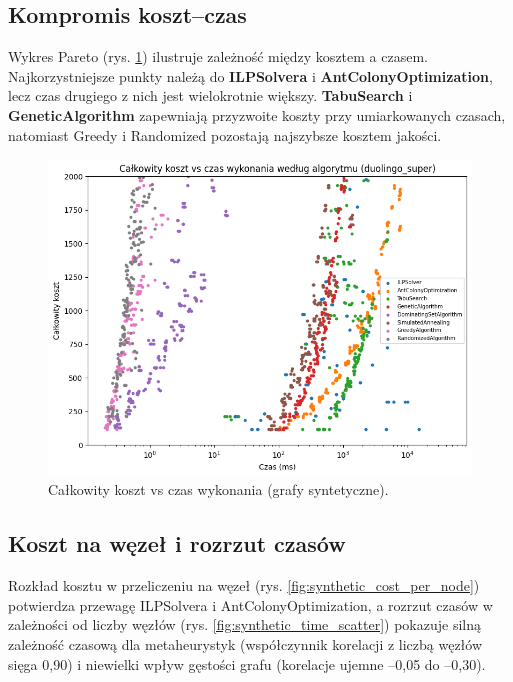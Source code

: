 \subsection{Kompromis koszt--czas}

Wykres Pareto (rys. \ref{fig:synthetic_pareto}) ilustruje zależność między kosztem a czasem. Najkorzystniejsze punkty należą do \textbf{ILPSolvera} i \textbf{AntColonyOptimization}, lecz czas drugiego z nich jest wielokrotnie większy. \textbf{TabuSearch} i \textbf{GeneticAlgorithm} zapewniają przyzwoite koszty przy umiarkowanych czasach, natomiast Greedy i Randomized pozostają najszybsze kosztem jakości.

\begin{figure}[H]
  \centering
  \includegraphics[width=0.7\linewidth]{assets/figures/synthetic_pareto.png}
  \caption{Całkowity koszt vs czas wykonania (grafy syntetyczne).}
  \label{fig:synthetic_pareto}
\end{figure}

\subsection{Koszt na węzeł i rozrzut czasów}

Rozkład kosztu w przeliczeniu na węzeł (rys. \ref{fig:synthetic_cost_per_node}) potwierdza przewagę ILPSolvera i AntColonyOptimization, a rozrzut czasów w zależności od liczby węzłów (rys. \ref{fig:synthetic_time_scatter}) pokazuje silną zależność czasową dla metaheurystyk (współczynnik korelacji z liczbą węzłów sięga 0,90) i niewielki wpływ gęstości grafu (korelacje ujemne --0,05 do --0,30).

